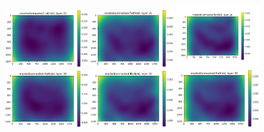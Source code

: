 \documentclass[letterpaper,11pt]{article}
\begin{document}
\begin{figure}[!ht]
\centering
\includegraphics[width=0.32\textwidth]{images/results/masked_over_unmasked_flatfield_image_layers_polaris/masked_over_unmasked_flatfield_layer_21}
\includegraphics[width=0.32\textwidth]{images/results/masked_over_unmasked_flatfield_image_layers_polaris/masked_over_unmasked_flatfield_layer_25}
\includegraphics[width=0.32\textwidth]{images/results/masked_over_unmasked_flatfield_image_layers_polaris/masked_over_unmasked_flatfield_layer_29}
\includegraphics[width=0.32\textwidth]{images/results/masked_over_unmasked_flatfield_image_layers_polaris/masked_over_unmasked_flatfield_layer_30}
\includegraphics[width=0.32\textwidth]{images/results/masked_over_unmasked_flatfield_image_layers_polaris/masked_over_unmasked_flatfield_layer_33}
\includegraphics[width=0.32\textwidth]{images/results/masked_over_unmasked_flatfield_image_layers_polaris/masked_over_unmasked_flatfield_layer_36}

\end{figure}
\end{document}
